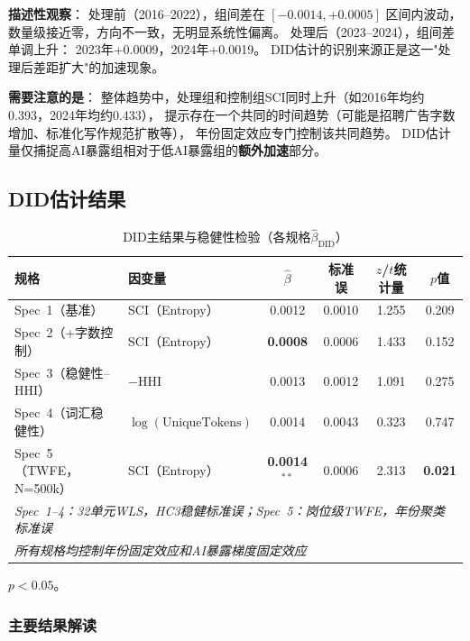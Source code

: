 \documentclass[12pt,a4paper]{ctexart}
\begin{document}
\textbf{描述性观察}：
处理前（2016--2022），组间差在 $[-0.0014, +0.0005]$ 区间内波动，
数量级接近零，方向不一致，无明显系统性偏离。
处理后（2023--2024），组间差单调上升：
2023年+0.0009，2024年+0.0019。
DID估计的识别来源正是这一"处理后差距扩大"的加速现象。

\textbf{需要注意的是}：
整体趋势中，处理组和控制组SCI同时上升（如2016年均约0.393，2024年均约0.433），
提示存在一个共同的时间趋势（可能是招聘广告字数增加、标准化写作规范扩散等），
年份固定效应专门控制该共同趋势。
DID估计量仅捕捉高AI暴露组相对于低AI暴露组的\textbf{额外加速}部分。

\subsection{DID估计结果}

\begin{table}[H]
\centering
\caption{DID主结果与稳健性检验（各规格$\hat{\beta}_{\text{DID}}$）}
\begin{threeparttable}
\begin{tabular}{llcccc}
\toprule
规格 & 因变量 & $\hat{\beta}$ & 标准误 & $z$/$t$统计量 & $p$值 \\
\midrule
Spec~1（基准） & SCI（Entropy） & 0.0012 & 0.0010 & 1.255 & 0.209 \\
Spec~2（+字数控制） & SCI（Entropy） & \textbf{0.0008} & 0.0006 & 1.433 & 0.152 \\
Spec~3（稳健性--HHI） & $-$HHI & 0.0013 & 0.0012 & 1.091 & 0.275 \\
Spec~4（词汇稳健性） & $\log(\text{UniqueTokens})$ & 0.0014 & 0.0043 & 0.323 & 0.747 \\
Spec~5（TWFE，N=500k） & SCI（Entropy） & \textbf{0.0014}$^{**}$ & 0.0006 & 2.313 & \textbf{0.021} \\
\midrule
\multicolumn{6}{l}{\textit{Spec~1--4：32单元WLS，HC3稳健标准误；Spec~5：岗位级TWFE，年份聚类标准误}} \\
\multicolumn{6}{l}{\textit{所有规格均控制年份固定效应和AI暴露梯度固定效应}} \\
\bottomrule
\end{tabular}
\begin{tablenotes}
\small
\item[$**$] $p < 0.05$。
\end{tablenotes}
\end{threeparttable}
\end{table}

\subsubsection{主要结果解读}
\end{document}
